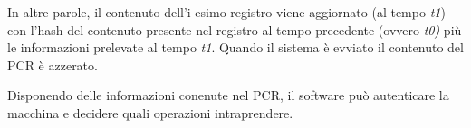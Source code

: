 In altre parole, il contenuto dell'i-esimo registro viene aggiornato (al tempo \textit{t1}) con l'hash del contenuto presente nel registro al tempo precedente (ovvero \textit{t0)} più le informazioni prelevate al tempo \textit{t1}. Quando il sistema è evviato il contenuto del PCR è azzerato.

Disponendo delle informazioni conenute nel PCR, il software può autenticare la macchina e decidere quali operazioni intraprendere.
\cite{wiki_tpm}